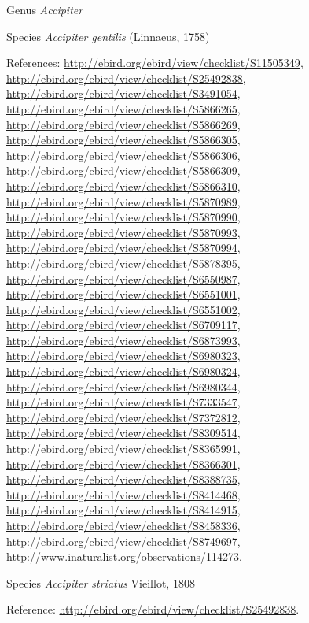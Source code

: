 \documentclass[9pt, article]{memoir}
\begin{document}
\begin{multicols}{2}
\vspace{6pt}\noindent\hspace{30pt}Genus \textit{Accipiter}


\vspace{6pt}\noindent\hspace{36pt}Species \textit{Accipiter gentilis} (Linnaeus, 1758)


\vspace{6pt}References: 
\url{http://ebird.org/ebird/view/checklist/S11505349}, 
\url{http://ebird.org/ebird/view/checklist/S25492838}, 
\url{http://ebird.org/ebird/view/checklist/S3491054}, 
\url{http://ebird.org/ebird/view/checklist/S5866265}, 
\url{http://ebird.org/ebird/view/checklist/S5866269}, 
\url{http://ebird.org/ebird/view/checklist/S5866305}, 
\url{http://ebird.org/ebird/view/checklist/S5866306}, 
\url{http://ebird.org/ebird/view/checklist/S5866309}, 
\url{http://ebird.org/ebird/view/checklist/S5866310}, 
\url{http://ebird.org/ebird/view/checklist/S5870989}, 
\url{http://ebird.org/ebird/view/checklist/S5870990}, 
\url{http://ebird.org/ebird/view/checklist/S5870993}, 
\url{http://ebird.org/ebird/view/checklist/S5870994}, 
\url{http://ebird.org/ebird/view/checklist/S5878395}, 
\url{http://ebird.org/ebird/view/checklist/S6550987}, 
\url{http://ebird.org/ebird/view/checklist/S6551001}, 
\url{http://ebird.org/ebird/view/checklist/S6551002}, 
\url{http://ebird.org/ebird/view/checklist/S6709117}, 
\url{http://ebird.org/ebird/view/checklist/S6873993}, 
\url{http://ebird.org/ebird/view/checklist/S6980323}, 
\url{http://ebird.org/ebird/view/checklist/S6980324}, 
\url{http://ebird.org/ebird/view/checklist/S6980344}, 
\url{http://ebird.org/ebird/view/checklist/S7333547}, 
\url{http://ebird.org/ebird/view/checklist/S7372812}, 
\url{http://ebird.org/ebird/view/checklist/S8309514}, 
\url{http://ebird.org/ebird/view/checklist/S8365991}, 
\url{http://ebird.org/ebird/view/checklist/S8366301}, 
\url{http://ebird.org/ebird/view/checklist/S8388735}, 
\url{http://ebird.org/ebird/view/checklist/S8414468}, 
\url{http://ebird.org/ebird/view/checklist/S8414915}, 
\url{http://ebird.org/ebird/view/checklist/S8458336}, 
\url{http://ebird.org/ebird/view/checklist/S8749697}, 
\url{http://www.inaturalist.org/observations/114273}.

\vspace{6pt}\noindent\hspace{36pt}Species \textit{Accipiter striatus} Vieillot, 1808


\vspace{6pt}Reference: 
\url{http://ebird.org/ebird/view/checklist/S25492838}.


\end{multicols}
\end{document}
